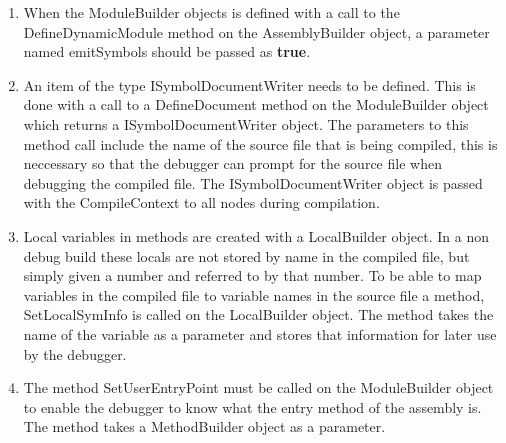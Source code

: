 	\begin{enumerate}
 		\item When the \textsf{ModuleBuilder} objects is defined with a call to the 
 		\textsf{DefineDynamicModule} method on the \textsf{AssemblyBuilder} object, a
 		parameter named \textsf{emitSymbols} should be passed as \textbf{true}.
 		
		\item An item of the type \textsf{ISymbolDocumentWriter} needs to be defined. 
		This is done with a call to a \textsf{DefineDocument} method on the 
		\textsf{ModuleBuilder} object which returns a \textsf{ISymbolDocumentWriter} 
		object. The parameters to this method call include the name of the source 
		file that is being compiled, this is neccessary so that the debugger can 
		prompt for the source file when debugging the compiled file. The 
		\textsf{ISymbolDocumentWriter} object is passed with the \textsf{CompileContext}
		to all nodes during compilation.

		\item Local variables in methods are created with a \textsf{LocalBuilder} 
		object. In a non debug build these locals are not stored by name in the 
		compiled file, but simply given a number and referred to by that number.
		To be able to map variables in the compiled file to variable names in the
		source file a method, \textsf{SetLocalSymInfo} is called on the 
		\textsf{LocalBuilder} object. The method takes the name of the variable as
		a parameter and stores that information for later use by the debugger.
		
		\item The method \textsf{SetUserEntryPoint} must be called on the 
		\textsf{ModuleBuilder} object to enable the debugger to know what the entry
		method of the assembly is. The method takes a \textsf{MethodBuilder} object
		as a parameter.
		

\end{enumerate}
